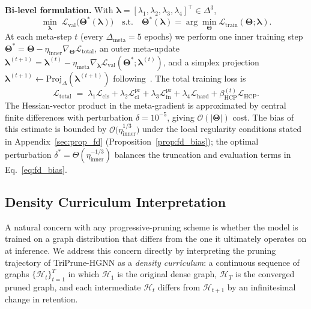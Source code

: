 \documentclass[10pt]{article}
\theoremstyle{plain}
\theoremstyle{definition}
\begin{document}
\textbf{Bi-level formulation.}
With $\boldsymbol{\lambda}=[\lambda_1,\lambda_2,\lambda_3,\lambda_4]^\top
\in\Delta^{3}$,
\begin{equation}
\min_{\boldsymbol{\lambda}}\;
\mathcal{L}_{\mathrm{val}}\!\big(\boldsymbol{\Theta}^*(\boldsymbol{\lambda})\big)
\quad\text{s.t.}\quad
\boldsymbol{\Theta}^*(\boldsymbol{\lambda}) =
\arg\min_{\boldsymbol{\Theta}}
\mathcal{L}_{\mathrm{train}}(\boldsymbol{\Theta};\boldsymbol{\lambda}).
\label{eq:bilevel}
\end{equation}
At each meta-step $t$ (every $\Delta_{\mathrm{meta}}=5$ epochs) we
perform one inner training step
$\boldsymbol{\Theta}^* = \boldsymbol{\Theta} - \eta_{\mathrm{inner}}
\nabla_{\boldsymbol{\Theta}}\mathcal{L}_{\mathrm{total}}$, an outer
meta-update
$\boldsymbol{\lambda}^{(t+1)} = \boldsymbol{\lambda}^{(t)} -
\eta_{\mathrm{meta}}\nabla_{\boldsymbol{\lambda}}
\mathcal{L}_{\mathrm{val}}(\boldsymbol{\Theta}^*;\boldsymbol{\lambda}^{(t)})$,
and a simplex projection
$\boldsymbol{\lambda}^{(t+1)}\!\leftarrow\!\mathrm{Proj}_{\Delta}
(\boldsymbol{\lambda}^{(t+1)})$ following~\citet{duchi2008efficient}.
The total training loss is
\begin{equation}
\mathcal{L}_{\mathrm{total}} \;=\;
\lambda_1\mathcal{L}_{\mathrm{cls}}
+\lambda_2\mathcal{L}_{\mathrm{cl}}^{\mathrm{pr}}
+\lambda_3\mathcal{L}_{\mathrm{fn}}^{\mathrm{pr}}
+\lambda_4\mathcal{L}_{\mathrm{hard}}
+\beta_{\mathrm{HCP}}^{(t)}\mathcal{L}_{\mathrm{HCP}}.
\label{eq:L_total}
\end{equation}
The Hessian-vector product in the meta-gradient is approximated by central finite differences with perturbation $\delta=10^{-5}$, giving  $\mathcal{O}(|\boldsymbol{\Theta}|)$ cost. The bias of this estimate is bounded by $\mathcal{O}\!\big(\eta_{\mathrm{inner}}^{1/3}\big)$
under the local regularity conditions stated in Appendix~\ref{sec:prop_fd} (Proposition~\ref{prop:fd_bias}); the optimal perturbation $\delta^{\!*}=\Theta(\eta_{\mathrm{inner}}^{-1/3})$ balances the truncation and evaluation terms in Eq.~\eqref{eq:fd_bias}.

\subsection{Density Curriculum Interpretation}
\label{sec:curriculum}

A natural concern with any progressive-pruning scheme is whether the model is trained on a graph distribution that differs from the one it ultimately operates on at inference. We address this concern directly by interpreting the pruning trajectory of TriPrune-HGNN as a \emph{density curriculum}: a continuous sequence of graphs $\{\mathcal{H}_t\}_{t=1}^{T}$ in which $\mathcal{H}_1$ is the original dense graph, $\mathcal{H}_T$ is the converged pruned graph, and each intermediate $\mathcal{H}_t$ differs from $\mathcal{H}_{t+1}$ by an infinitesimal change in retention.
\end{document}
